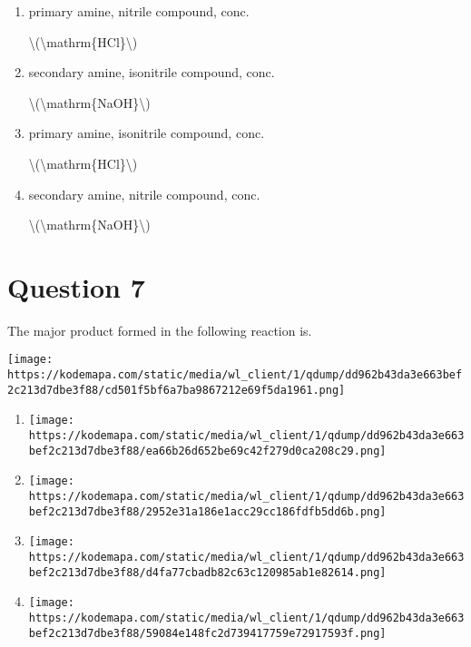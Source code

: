 \documentclass{article}
\begin{document}
\begin{enumerate}[label=(\alph*)]
\item primary amine, nitrile compound, conc.

\textbackslash(\textbackslash mathrm\{HCl\}\textbackslash)


\item secondary amine, isonitrile compound, conc.

\textbackslash(\textbackslash mathrm\{NaOH\}\textbackslash)


\item primary amine, isonitrile compound, conc.

\textbackslash(\textbackslash mathrm\{HCl\}\textbackslash)


\item secondary amine, nitrile compound, conc.

\textbackslash(\textbackslash mathrm\{NaOH\}\textbackslash)


\end{enumerate}
\newpage
\section*{Question 7}
The major product formed in the following reaction is.



\texttt{[image: https://kodemapa.com/static/media/wl\_client/1/qdump/dd962b43da3e663bef2c213d7dbe3f88/cd501f5bf6a7ba9867212e69f5da1961.png]}\\


\begin{enumerate}[label=(\alph*)]
\item \texttt{[image: https://kodemapa.com/static/media/wl\_client/1/qdump/dd962b43da3e663bef2c213d7dbe3f88/ea66b26d652be69c42f279d0ca208c29.png]}


\item \texttt{[image: https://kodemapa.com/static/media/wl\_client/1/qdump/dd962b43da3e663bef2c213d7dbe3f88/2952e31a186e1acc29cc186fdfb5dd6b.png]}


\item \texttt{[image: https://kodemapa.com/static/media/wl\_client/1/qdump/dd962b43da3e663bef2c213d7dbe3f88/d4fa77cbadb82c63c120985ab1e82614.png]}


\item \texttt{[image: https://kodemapa.com/static/media/wl\_client/1/qdump/dd962b43da3e663bef2c213d7dbe3f88/59084e148fc2d739417759e72917593f.png]}


\end{enumerate}
\newpage
\end{document}
